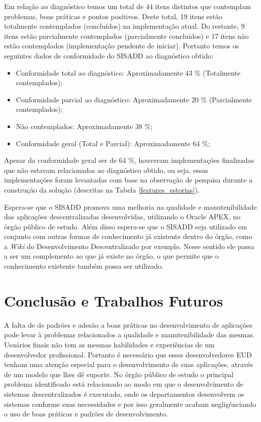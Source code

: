 Em relação ao diagnóstico temos um total de 44 itens distintos que contemplam problemas, boas práticas e pontos positivos. Deste total, 19 itens estão totalmente contemplados (concluídos) na implementação atual. Do restante, 9 itens estão parcialmente contemplados (parcialmente concluídos) e 17 itens não estão contemplados (implementação pendente de iniciar). Portanto temos os seguintes dados de conformidade do SISADD ao diagnóstico obtido:
\begin{itemize}
\item Conformidade total ao diagnóstico: Aproximadamente 43 \% (Totalmente contemplados);
\item Conformidade parcial ao diagnóstico: Aproximadamente 20 \% (Parcialmente contemplados);
\item Não contemplados: Aproximadamente 38 \%;
\item Conformidade geral (Total e Parcial): Aproximadamente 64 \%;
\end{itemize}

Apesar da conformidade geral ser de 64 \%, houveram implementações finalizadas que não estavam relacionadas ao diagnóstico obtido, ou seja, essas implementações foram levantadas com base na observação de pesquisa durante a construção da solução (descritas na Tabela \ref{features_estorias}).

Espera-se que o SISADD promova uma melhoria na qualidade e manutenibilidade das aplicações descentralizadas desenvolvidas, utilizando o Oracle APEX, no órgão público de estudo. Além disso espera-se que o SISADD seja utilizado em conjunto com outras formas de conhecimento já existente dentro do órgão, como a \textit{Wiki} do Desenvolvimento Descentralizado por exemplo. Nesse sentido ele passa a ser um complemento ao que já existe no órgão, o que permite que o conhecimento existente também possa ser utilizado.

\chapter{Conclusão e Trabalhos Futuros}

A falta de de padrões e adesão a boas práticas no desenvolvimento de aplicações pode levar à problemas relacionados a qualidade e manutenibilidade das mesmas. Usuários finais não tem as mesmas habilidades e experiências de um desenvolvedor profissional. Portanto é necessário que esses desenvolvedores EUD tenham uma atenção especial para o desenvolvimento de suas aplicações, através de um modelo que lhes dê suporte. No órgão público de estudo o principal problema identificado está relacionado ao modo em que o desenvolvimento de sistemas descentralizados é executado, onde os departamentos desenvolvem os sistemas conforme suas necessidades e por isso geralmente acabam negligênciando o uso de boas práticas e padrões de desenvolvimento.


